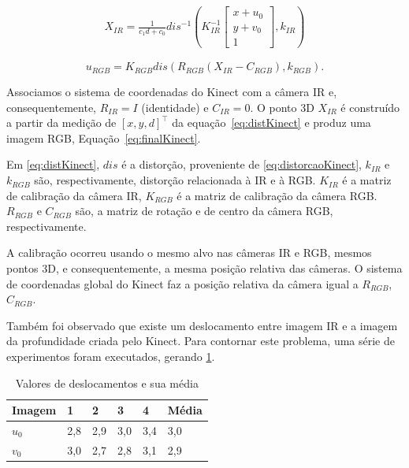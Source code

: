 \begin{gather} 
X_{IR} = \frac{1}{c_1 d + c_0}dis^{-1}\left ( K^{-1}_{IR}
\begin{bmatrix}
x+u_0\\ 
y+v_0\\ 
1
\end{bmatrix},k_{IR} 
\right )
\label{eq:distKinect}
\end{gather}

\begin{equation}
\label{eq:finalKinect}
u_{RGB} = K_{RGB} dis(R_{RGB}(X_{IR} - C_{RGB}),k_{RGB}).
\end{equation}

Associamos o sistema de coordenadas do Kinect com a câmera IR e,
consequentemente, $R_{IR} = I$ (identidade) e $C_{IR} = 0$.  O ponto 3D $X_{IR}$
é construído a partir da medição de $[x,y,d]^\top$ da equação~\ref{eq:distKinect} e
produz uma imagem RGB, Equação~\ref{eq:finalKinect}.

Em \ref{eq:distKinect}, $dis$ é a distorção, proveniente de
\ref{eq:distorcaoKinect}, $k_{IR}$ e $k_{RGB}$ são, respectivamente, distorção
relacionada à IR e à RGB.  $K_{IR}$ é a matriz de calibração da câmera IR,
$K_{RGB}$ é a matriz de calibração da câmera RGB. $R_{RGB}$ e $C_{RGB}$ são, a
matriz de rotação e de centro da câmera RGB, respectivamente.

A calibração ocorreu usando o mesmo alvo nas câmeras IR e RGB, mesmos pontos 3D,
e consequentemente, a mesma posição relativa das câmeras.  O sistema de
coordenadas global do Kinect faz a posição relativa da câmera igual a $R_{RGB}$,
$C_{RGB}$.

Também foi observado que existe um deslocamento entre imagem IR e a imagem da
profundidade criada pelo Kinect. Para contornar este problema, uma série de
experimentos foram executados, gerando \ref{tab:deslocamentoKinect}.

\begin{table}[!h]
\centering
\caption{Valores de deslocamentos e sua média}
\label{tab:deslocamentoKinect}
\begin{tabular}{|l|l|l|l|l|l|}
\hline
Imagem & 1   & 2   & 3   & 4   & Média \\ \hline
$u_0$  & 2,8 & 2,9 & 3,0 & 3,4 & 3,0   \\ \hline
$v_0$  & 3,0 & 2,7 & 2,8 & 3,1 & 2,9   \\ \hline
\end{tabular}
\end{table}

